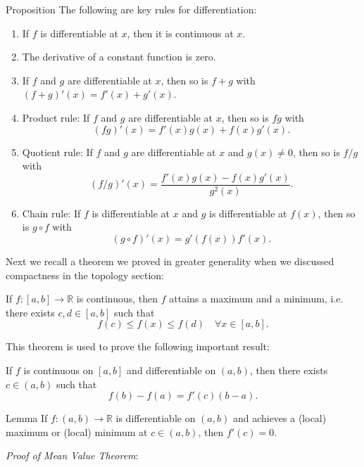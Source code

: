 \documentclass [aspectratio=169]{beamer}
\newcommand{\R}{{\mathbb{R}}}
\begin{document}
\begin{frame}
\begin{exampleblock}{Proposition}
The following are key rules for differentiation:
\begin{enumerate}
    \item If $f$ is differentiable at $x$, then it is continuous at $x$.
    \item The derivative of a constant function is zero.
    \item If $f$ and $g$ are differentiable at $x$, then so is $f+g$ with $(f+g)'(x) = f'(x) + g'(x)$.
    \item Product rule: If $f$ and $g$ are differentiable at $x$, then so is $fg$ with $$(fg)'(x) = f'(x) g(x) + f(x) g'(x).$$
    \item Quotient rule: If $f$ and $g$ are differentiable at $x$ and $g(x) \neq 0$, then so is $f/g$ with $$(f/g)'(x) = \frac{f'(x) g(x) - f(x) g'(x)}{g^2(x)}.$$
    \item Chain rule: If $f$ is differentiable at $x$ and $g$ is differentiable at $f(x)$, then so is $g \circ f$ with $$(g \circ f)'(x)= g'(f(x))f'(x).$$
\end{enumerate}
\end{exampleblock}
\end{frame}

\begin{frame}
Next we recall a theorem we proved in greater generality when we discussed compactness in the topology section:
\begin{theorem}
If $f:[a,b] \to \R$ is continuous, then $f$ attains a maximum and a minimum, i.e. there exists $c,d \in [a,b]$ such that
$$ f(c) \leq f(x) \leq f(d) \quad \forall x \in [a,b] .$$
\end{theorem}

This theorem is used to prove the following important result:

\begin{theorem}
If $f$ is continuous on $[a,b]$ and differentiable on $(a,b)$, then there exists $c \in (a,b)$ such that 
$$f(b) - f(a) = f'(c)(b-a) .$$
\end{theorem}
\end{frame}


\begin{frame}
\begin{alertblock}{Lemma}
If $f:(a,b) \to \R$ is differentiable on $(a,b)$ and achieves a (local) maximum or (local) minimum at $c \in (a,b)$, then $f'(c) = 0$.
\end{alertblock}

\vspace{1em}
\textit{Proof of Mean Value Theorem}:
\vspace{3cm}
\end{frame}
\end{document}
